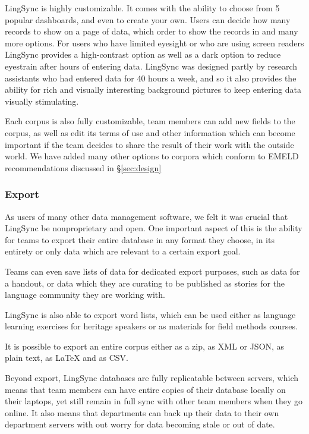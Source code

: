 \documentclass[letterpaper, 12pt, dvips]{mitwpl}
\begin{document}
LingSync is highly customizable. It comes with the ability to choose from 5 popular dashboards, and even to create your own. Users can decide how many records to show on a page of data, which order to show the records in and many more options. For users who have limited eyesight or who are using screen readers LingSync provides a high-contrast option as well as a dark option to reduce eyestrain after hours of entering data. LingSync was designed partly by research assistants who had entered data for 40 hours a week, and so it also provides the ability for rich and visually interesting background pictures to keep entering data visually stimulating.

Each corpus is also fully customizable, team members can add new fields to the corpus, as well as edit its terms of use and other information which can become important if the team decides to share the result of their work with the outside world. We have added many other options to corpora which conform to EMELD recommendations discussed in \S\ref{sec:design}

\subsubsection{Export}

As users of many other data management software, we felt it was crucial that LingSync be nonproprietary and open. One important aspect of this is the ability for teams to export their entire database in any format they choose, in its entirety or only data which are relevant to a certain export goal. 

Teams can even save lists of data for dedicated export purposes, such as data for a handout, or data which they are curating to be published as stories for the language community they are working with.

LingSync is also able to export word lists, which can be used either as language learning exercises for heritage speakers or as materials for field methods courses. 

It is possible to export an entire corpus either as a zip, as XML or JSON, as plain text, as LaTeX and  as CSV. 

Beyond export, LingSync databases are fully replicatable between servers, which means that team members can have entire copies of their database locally on their laptops, yet still remain in full sync with other team members when they go online. It also means that departments can back up their data to their own department servers with out worry for data becoming stale or out of date. 
\end{document}
